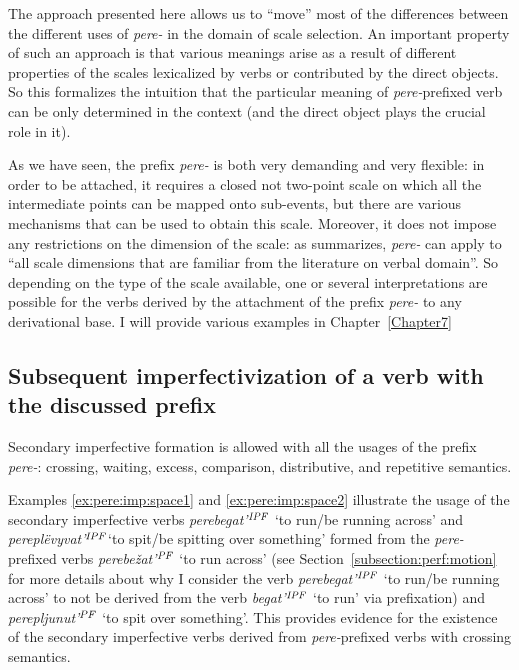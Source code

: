 The approach presented here allows us to ``move'' most of the differences between the different uses of \textit{pere-} in the domain of scale selection. An important property of such an approach is that various meanings arise as a result of different properties of the scales lexicalized by verbs or contributed by the direct objects. So this formalizes the intuition that the particular meaning of \textit{pere-}prefixed verb can be only determined in the context (and the direct object plays the crucial role in it). 

As we have seen, the prefix \textit{pere-} is both very demanding and very flexible: in order to be attached, it requires a closed not two-point scale on which all the intermediate points can be mapped onto sub-events, but there are various mechanisms that can be used to obtain this scale. Moreover, it does not impose any restrictions on the dimension of the scale: as \citet[151]{Kagan:book} summarizes, \textit{pere-} can apply to ``all scale dimensions that are familiar from the literature on verbal domain''. So depending on the type of the scale available, one or several interpretations are possible for the verbs derived by the attachment of the prefix \textit{pere-} to any derivational base. I will provide various examples in Chapter~\ref{Chapter7}

\subsection{Subsequent imperfectivization of a verb with the discussed prefix}
Secondary imperfective formation is allowed with all the usages of the prefix \textit{pere-}: crossing, waiting, excess, comparison, distributive, and repetitive semantics.

Examples \ref{ex:pere:imp:space1} and \ref{ex:pere:imp:space2} illustrate the usage of the secondary imperfective verbs \textit{perebegat'$^{\mathit{IPF}}$} `to run/be running across' and \textit{perepl\"{e}vyvat'$^{\mathit{IPF}}$}`to spit/be spitting over something' formed from the \textit{pere-}prefixed verbs \textit{perebe\v{z}at'$^{\mathit{PF}}$} `to run across' (see Section~\ref{subsection:perf:motion} for more details about why I consider the verb \textit{perebegat'$^{\mathit{IPF}}$} `to run/be running across' to not be derived from the verb \textit{begat'}$^{\mathit{IPF}}$ `to run' via prefixation) and \textit{perepljunut'$^{\mathit{PF}}$} `to spit over something'. This provides evidence for the existence of the secondary imperfective verbs derived from \textit{pere-}prefixed verbs with crossing semantics.

